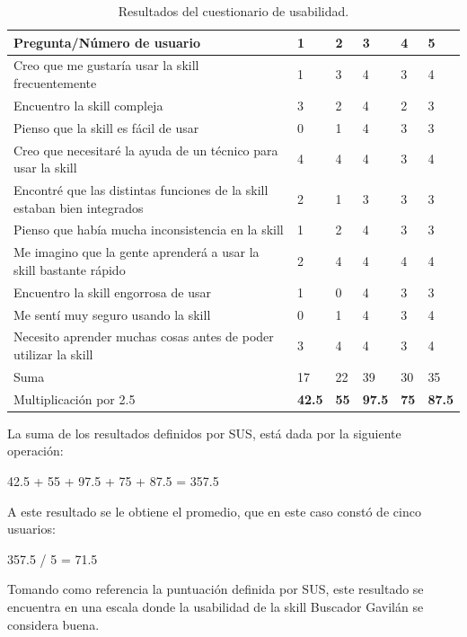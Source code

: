 \begin{table}[H]
  \begin{center}
    \begin{tabular}{ | p{9cm} | p{1cm} | p{1cm} | p{1cm} | p{1cm} | p{1cm} | }
      \hline
      \textbf{Pregunta/Número de usuario} & 1 & 2 & 3 & 4 & 5 \\ \hline
      Creo que me gustaría usar la skill frecuentemente & 1 & 3 & 4 & 3 & 4 \\ \hline
      Encuentro la skill compleja & 3 & 2 & 4 & 2 & 3 \\ \hline
      Pienso que la skill es fácil de usar & 0 & 1 & 4 & 3 & 3 \\ \hline
      Creo que necesitaré la ayuda de un técnico para usar la skill & 4 & 4 & 4 & 3 & 4 \\ \hline
      Encontré que las distintas funciones de la skill estaban bien integrados & 2 & 1 & 3 & 3 & 3 \\ \hline
      Pienso que había mucha inconsistencia en la skill & 1 & 2 & 4 & 3 & 3 \\ \hline
      Me imagino que la gente aprenderá a usar la skill bastante rápido & 2 & 4 & 4 & 4 & 4 \\ \hline
      Encuentro la skill engorrosa de usar & 1 & 0 & 4 & 3 & 3 \\ \hline
      Me sentí muy seguro usando la skill & 0 & 1 & 4 & 3 & 4 \\ \hline
      Necesito aprender muchas cosas antes de poder utilizar la skill & 3 & 4 & 4 & 3 & 4 \\ \hline
      Suma & 17 & 22 & 39 & 30 & 35 \\ \hline
      Multiplicación por 2.5 & \textbf{42.5} & \textbf{55} & \textbf{97.5} & \textbf{75} & \textbf{87.5} \\ \hline
    \end{tabular}
    \caption{Resultados del cuestionario de usabilidad.}
    \label{tab:t45}
  \end{center}
\end{table}

La suma de los resultados definidos por SUS, está dada por la siguiente operación:

42.5 + 55 + 97.5 + 75 + 87.5 = 357.5

A este resultado se le obtiene el promedio, que en este caso constó de cinco usuarios:

357.5 / 5 = 71.5

Tomando como referencia la puntuación definida por SUS, este resultado se encuentra en una escala donde la usabilidad de la skill Buscador Gavilán se considera buena.

